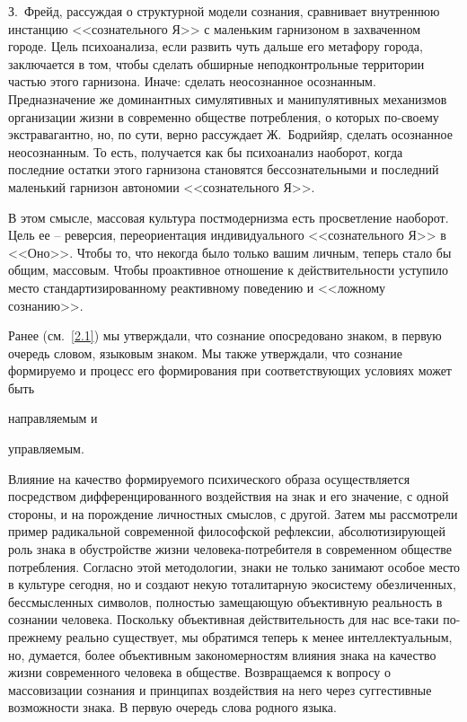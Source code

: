 З.~Фрейд, рассуждая о структурной модели сознания, сравнивает внутреннюю
инстанцию <<сознательного Я>> с маленьким гарнизоном в захваченном городе\autocite[][116]{freud1992}.
Цель психоанализа, если развить чуть дальше его метафору города, заключается в том,
чтобы сделать обширные неподконтрольные территории частью этого гарнизона.
Иначе: сделать неосознанное осознанным. Предназначение же доминантных симулятивных
и манипулятивных механизмов организации жизни в современно обществе потребления, о
которых по-своему экстравагантно, но, по сути, верно рассуждает Ж.~Бодрийяр, сделать
осознанное неосознанным. То есть, получается как бы психоанализ наоборот, когда
последние остатки этого гарнизона становятся бессознательными и последний маленький
гарнизон автономии <<сознательного Я>>.

В этом смысле, массовая культура постмодернизма есть просветление наоборот.
Цель ее -- реверсия, переориентация индивидуального <<сознательного Я>> в <<Оно>>.
Чтобы то, что некогда было только вашим личным, теперь стало бы общим, массовым.
Чтобы проактивное отношение к действительности уступило место стандартизированному
реактивному поведению и <<ложному сознанию>>\autocite[][89]{eagleton1991ideology}.

Ранее (см.~\ref{2.1}) мы утверждали, что сознание опосредовано знаком, в первую
очередь словом, языковым знаком. Мы также утверждали, что сознание формируемо и
процесс его формирования при соответствующих условиях может быть
\begin{enumerate*}[label=\asbuk*)]
    \item направляемым и
    \item управляемым.
\end{enumerate*}
Влияние на качество формируемого психического образа осуществляется
посредством дифференцированного воздействия на знак и его значение, с одной стороны,
и на порождение личностных смыслов, с другой. Затем мы рассмотрели пример
радикальной современной философской рефлексии, абсолютизирующей роль знака в
обустройстве жизни человека-потребителя в современном обществе потребления.
Согласно этой методологии, знаки не только занимают особое место в культуре
сегодня, но и создают некую тоталитарную экосистему обезличенных, бессмысленных
символов, полностью замещающую объективную реальность в сознании человека.
Поскольку объективная действительность для нас все-таки по-прежнему реально
существует, мы обратимся теперь к менее интеллектуальным, но, думается, более
объективным закономерностям влияния знака на качество жизни современного человека в
обществе. Возвращаемся к вопросу о массовизации сознания и принципах воздействия
на него через суггестивные возможности знака. В первую очередь слова родного языка.

